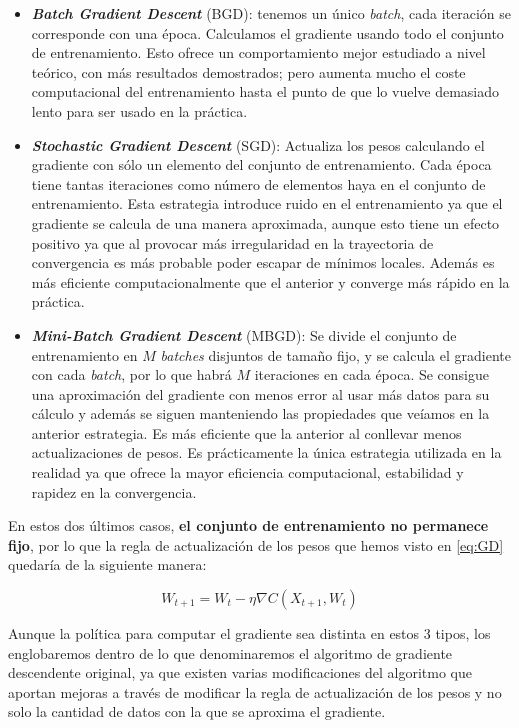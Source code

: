 \begin{itemize}
    \item \textbf{\emph{Batch Gradient Descent}} (BGD): tenemos un único \textit{batch}, cada iteración se corresponde con una época. Calculamos el gradiente usando todo el conjunto de entrenamiento. Esto ofrece un comportamiento mejor estudiado a nivel teórico, con más resultados demostrados; pero aumenta mucho el coste computacional del entrenamiento hasta el punto de que lo vuelve demasiado lento para ser usado en la práctica.

    \item \textbf{\emph{Stochastic Gradient Descent}} (SGD): Actualiza los pesos calculando el gradiente con sólo un elemento del conjunto de entrenamiento. Cada época tiene tantas iteraciones como número de elementos haya en el conjunto de entrenamiento. Esta estrategia introduce ruido en el entrenamiento ya que el gradiente se calcula de una manera aproximada, aunque esto tiene un efecto positivo ya que al provocar más irregularidad en la trayectoria de convergencia es más probable poder escapar de mínimos locales. Además es más eficiente computacionalmente que el anterior y converge más rápido en la práctica.

    \item \textbf{\emph{Mini-Batch Gradient Descent}} (MBGD): Se divide el conjunto de entrenamiento en $M$ \textit{batches} disjuntos de tamaño fijo, y se calcula el gradiente con cada \textit{batch}, por lo que habrá $M$ iteraciones en cada época. Se consigue una aproximación del gradiente con menos error al usar más datos para su cálculo y además se siguen manteniendo las propiedades que veíamos en la anterior estrategia. Es más eficiente que la anterior al conllevar menos actualizaciones de pesos. Es prácticamente la única estrategia utilizada en la realidad ya que ofrece la mayor eficiencia computacional, estabilidad y rapidez en la convergencia.
\end{itemize}

En estos dos últimos casos, \textbf{el conjunto de entrenamiento no permanece fijo}, por lo que la regla de actualización de los pesos que hemos visto en \eqref{eq:GD} quedaría de la siguiente manera:

\begin{equation}\label{eq:SGD}
	W_{t+1} = W_t - \eta \nabla C(X_{t+1}, W_t)
\end{equation}

Aunque la política para computar el gradiente sea distinta en estos 3 tipos, los englobaremos dentro de lo que denominaremos el algoritmo de gradiente descendente original, ya que existen varias modificaciones del algoritmo que aportan mejoras a través de modificar la regla de actualización de los pesos y no solo la cantidad de datos con la que se aproxima el gradiente.

